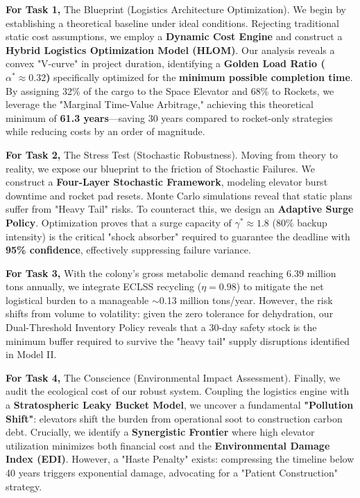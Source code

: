 \documentclass[11pt,letterpaper]{article}
\begin{document}
\textbf{For Task 1,} The Blueprint (Logistics Architecture Optimization). We begin by establishing a theoretical baseline under ideal conditions. Rejecting traditional static cost assumptions, we employ a \textbf{Dynamic Cost Engine} and construct a \textbf{Hybrid Logistics Optimization Model (HLOM)}. Our analysis reveals a convex "V-curve" in project duration, identifying a \textbf{Golden Load Ratio ($\alpha^* \approx 0.32$)} specifically optimized for the \textbf{minimum possible completion time}. By assigning 32\% of the cargo to the Space Elevator and 68\% to Rockets, we leverage the "Marginal Time-Value Arbitrage," achieving this theoretical minimum of \textbf{61.3 years}—saving 30 years compared to rocket-only strategies while reducing costs by an order of magnitude.

\textbf{For Task 2,} The Stress Test (Stochastic Robustness). Moving from theory to reality, we expose our blueprint to the friction of Stochastic Failures. We construct a \textbf{Four-Layer Stochastic Framework}, modeling elevator burst downtime and rocket pad resets. Monte Carlo simulations reveal that static plans suffer from "Heavy Tail" risks. To counteract this, we design an \textbf{Adaptive Surge Policy}. Optimization proves that a surge capacity of \textbf{$\gamma^* \approx 1.8$} (80\% backup intensity) is the critical "shock absorber" required to guarantee the deadline with \textbf{95\% confidence}, effectively suppressing failure variance.

\textbf{For Task 3,} With the colony's gross metabolic demand reaching 6.39 million tons annually, we integrate ECLSS recycling ($\eta = 0.98$) to mitigate the net logistical burden to a manageable $\sim$0.13 million tons/year. However, the risk shifts from volume to volatility: given the zero tolerance for dehydration, our Dual-Threshold Inventory Policy reveals that a 30-day safety stock is the minimum buffer required to survive the "heavy tail" supply disruptions identified in Model II.

\textbf{For Task 4,} The Conscience (Environmental Impact Assessment). Finally, we audit the ecological cost of our robust system. Coupling the logistics engine with a \textbf{Stratospheric Leaky Bucket Model}, we uncover a fundamental \textbf{"Pollution Shift"}: elevators shift the burden from operational soot to construction carbon debt. Crucially, we identify a \textbf{Synergistic Frontier} where high elevator utilization minimizes both financial cost and the \textbf{Environmental Damage Index (EDI)}. However, a "Haste Penalty" exists: compressing the timeline below 40 years triggers exponential damage, advocating for a "Patient Construction" strategy.
\end{document}
